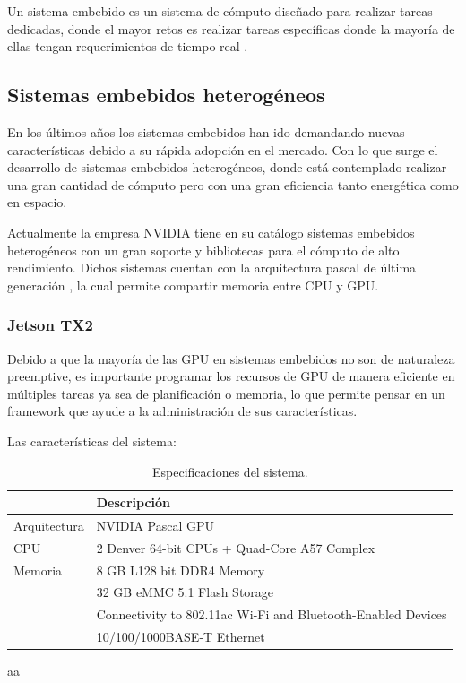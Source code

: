 Un sistema embebido es un sistema de cómputo diseñado para realizar tareas dedicadas, donde el mayor retos es realizar tareas específicas donde la mayoría de ellas tengan requerimientos de tiempo real \cite{LimPree}.

\subsection{Sistemas embebidos heterogéneos}
%
\vspace{0.3cm}
En los últimos años los sistemas embebidos han ido demandando nuevas características debido a su rápida adopción en el mercado. Con lo que surge el desarrollo de sistemas embebidos heterogéneos, donde está contemplado realizar una gran cantidad de cómputo pero con una gran eficiencia tanto energética como en espacio.
\vspace{0.3cm}

Actualmente la empresa NVIDIA tiene en su catálogo sistemas embebidos heterogéneos con un gran soporte y bibliotecas para el cómputo de alto rendimiento. Dichos sistemas cuentan con la arquitectura pascal de última generación \cite{GPUArt}, la cual permite compartir memoria entre CPU y GPU.

\subsubsection{Jetson TX2}

Debido a que la mayoría de las GPU en sistemas embebidos no son de naturaleza preemptive, es importante programar los recursos de GPU de manera eficiente en múltiples tareas \cite{TX2I} ya sea de planificación o memoria, lo que permite pensar en un framework que ayude a la administración de sus características. 

Las características del sistema:

\begin{table}[!tb]
  \begin{center}
        \scriptsize
    \begin{tabular}{|m{3.5cm}|m{4cm}|}
     \hline
    \cellcolor{lightgray} & \cellcolor{lightgray} \textbf{Descripción}\\ 
     \hline
     Arquitectura & NVIDIA Pascal GPU\\
     \hline
     CPU & 2 Denver 64-bit CPUs + Quad-Core A57 Complex\\
     \hline
     Memoria & 8 GB L128 bit DDR4 Memory\\
     
&32 GB eMMC 5.1 Flash Storage\\
     \hline
&Connectivity to 802.11ac Wi-Fi and Bluetooth-Enabled Devices\\
     \hline
&10/100/1000BASE-T Ethernet\\
     \hline
    \end{tabular}
    
    \caption{Especificaciones del sistema.}
    \label{tab:table1}
  \end{center}
\end{table}
aa

